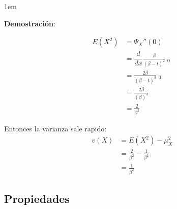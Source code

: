 \documentclass[12pt, fleqn]{report}                             %
\newenvironment{SmallIndentation}[1][0.75em]                    %
        {\begin{adjustwidth}{#1}{}\begin{footnotesize}}             %
        {\end{footnotesize}\end{adjustwidth}}                       %
\theoremstyle{break}                                            %
\newcommand \MiniDerivate[1][x]   {\dfrac{d}{d #1}}             %
\DeclareMathOperator \Evaluate  {\Big|}                         %
\begin{document}
                \begin{SmallIndentation}[1em]
                    \textbf{Demostración}:
                    
                    \begin{align*}
                        E(X^2)
                            &= \Psi_X'' (0)                                             \\
                            &= \MiniDerivate \frac{\beta}{(\beta - t)^2} \Evaluate_0    \\
                            &= \frac{2\beta}{(\beta - t)^3} \Evaluate_0                 \\
                            &= \frac{2\beta}{(\beta)^3}                                 \\
                            &= \frac{2}{\beta^2}
                    \end{align*}

                    Entonces la varianza sale rapido:
                    \begin{align*}
                        v(X)
                            &= E(X^2) - \mu_X^2                                         \\
                            &= \frac{2}{\beta^2} - \frac{1}{\beta^2}                    \\
                            &= \frac{1}{\beta^2}
                    \end{align*}
                
                \end{SmallIndentation}




            \clearpage
            \subsection{Propiedades}
\end{document}
